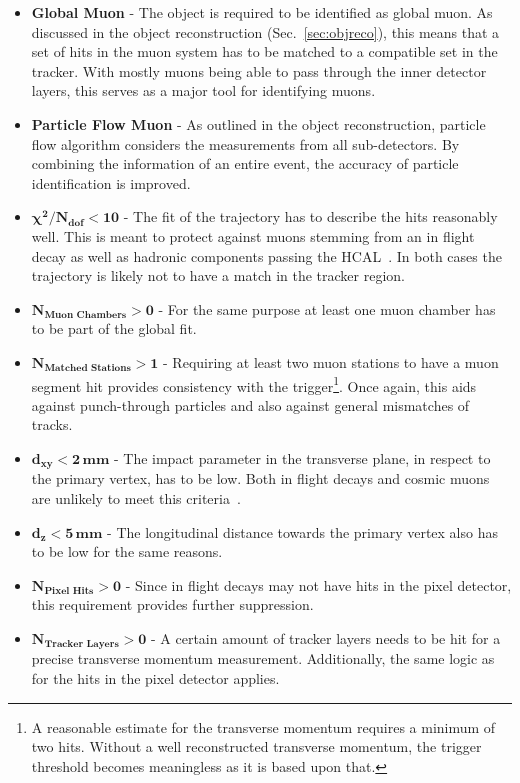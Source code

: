 \begin{itemize}
\item \textbf{Global Muon} - The object is required to be identified as global muon. As discussed in the object reconstruction (Sec.~\ref{sec:objreco}), this means that a set of hits in the muon system has to be matched to a compatible set in the tracker. With mostly muons being able to pass through the inner detector layers, this serves as a major tool for identifying muons.
\item \textbf{Particle Flow Muon} - As outlined in the object reconstruction, particle flow algorithm considers the measurements from all sub-detectors. By combining the information of an entire event, the accuracy of particle identification is improved.
\item $\mathbf{\chi^2 / N_{\textbf{dof}} < 10}$ - The fit of the trajectory has to describe the hits reasonably well. This is meant to protect against muons stemming from an in flight decay as well as hadronic components passing the HCAL~\cite{muonidcosmic}. In both cases the trajectory is likely not to have a match in the tracker region.
\item $\mathbf{N_{\textbf{Muon Chambers}} > 0}$ - For the same purpose at least one muon chamber has to be part of the global fit. 
\item $\mathbf{N_{\textbf{Matched Stations}} > 1}$ - Requiring at least two muon stations to have a muon segment hit provides consistency with the trigger\footnote{A reasonable estimate for the transverse momentum requires a minimum of two hits. Without a well reconstructed transverse momentum, the trigger threshold becomes meaningless as it is based upon that.}. Once again, this aids against punch-through particles and also against general mismatches of tracks.
\item $\mathbf{d_{xy} < 2\,\textbf{mm}}$ - The impact parameter in the transverse plane, in respect to the primary vertex, has to be low. Both in flight decays and cosmic muons are unlikely to meet this criteria~\cite{muonidcosmic}.
\item $\mathbf{d_z < 5\,\textbf{mm}}$ - The longitudinal distance towards the primary vertex also has to be low for the same reasons.
\item $\mathbf{N_{\textbf{Pixel Hits}} > 0}$ - Since in flight decays may not have hits in the pixel detector, this requirement provides further suppression.
\item $\mathbf{N_{\textbf{Tracker Layers}} > 0}$ - A certain amount of tracker layers needs to be hit for a precise transverse momentum measurement. Additionally, the same logic as for the hits in the pixel detector applies.
\end{itemize}


